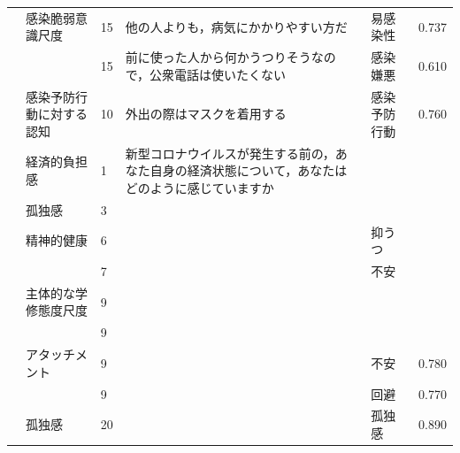 \begin{landscape}
\begin{longtable}{p{2cm}p{2cm}p{2cm}p{6cm}p{2cm}p{2cm}}
                                 & 感染脆弱意識尺度                         & 15  & 他の人よりも，病気にかかりやすい方だ                                  & 易感染性                 & 0.737   \\
                                 &                                  & 15  & 前に使った人から何かうつりそうなので，公衆電話は使いたくない                      & 感染嫌悪                 & 0.610   \\
                                 & 感染予防行動に対する認知                     & 10  & 外出の際はマスクを着用する                                       & 感染予防行動               & 0.760   \\
        \citet{Iida202192}       & 経済的負担感                           & 1   & 新型コロナウイルスが発生する前の，あなた自身の経済状態について，あなたはどのように感じていますか    &                      &         \\
                                 & 孤独感                              & 3   &                                                     &                      &         \\
                                 & 精神的健康                            & 6   &                                                     & 抑うつ                  &         \\
                                 &                                  & 7   &                                                     & 不安                   &         \\
        \citet{Nagai202192}      & 主体的な学修態度尺度                       & 9   &                                                     &                      &         \\
                                 &                                  & 9   &                                                     &                      &         \\
        \citet{Nakao202192}      & アタッチメント                          & 9   &                                                     & 不安                   & 0.780   \\
                                 &                                  & 9   &                                                     & 回避                   & 0.770   \\
                                 & 孤独感                              & 20  &                                                     & 孤独感                  & 0.890   \\

\end{longtable}
\end{landscape}
